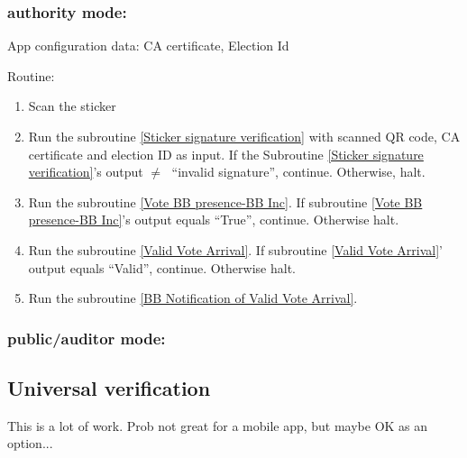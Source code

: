 \documentclass{article}
\begin{document}
\subsubsection{\localVotingCenter{} authority mode:}
App configuration data: CA certificate, Election Id

Routine:
\begin{enumerate}
    \item Scan the sticker
    \item Run the subroutine \ref{Sticker signature verification} with scanned QR code, CA certificate and election ID as input. If the Subroutine \ref{Sticker signature verification}'s output $\neq\;$ ``invalid signature'', continue. Otherwise, halt.
    \item Run the subroutine \ref{Vote BB presence-BB Inc}. If subroutine \ref{Vote BB presence-BB Inc}'s output equals ``True'', continue. Otherwise halt.
    \item Run the subroutine \ref{Valid Vote Arrival}. If subroutine \ref{Valid Vote Arrival}' output equals ``Valid'', continue. Otherwise halt.
    \item Run the subroutine \ref{BB Notification of Valid Vote Arrival}.
\end{enumerate}
\subsubsection{\localVotingCenter{}  public/auditor mode:}

\subsection{Universal verification}
    This is a lot of work. Prob not great for a mobile app, but maybe OK as an option...
\end{document}
